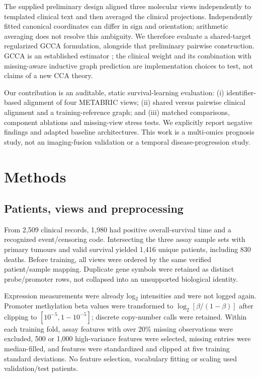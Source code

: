 \documentclass{article}
\begin{document}
The supplied preliminary design aligned three molecular views independently
to templated clinical text and then averaged the clinical projections.
Independently fitted canonical coordinates can differ in sign and orientation;
arithmetic averaging does not resolve this ambiguity. We therefore evaluate
a shared-target regularized GCCA formulation, alongside that preliminary
pairwise construction. GCCA is an established estimator \cite{gcca}; the
clinical weight and its combination with missing-aware inductive graph
prediction are implementation choices to test, not claims of a new CCA theory.

Our contribution is an auditable, static survival-learning evaluation:
(i) identifier-based alignment of four METABRIC views; (ii) shared versus
pairwise clinical alignment and a training-reference graph; and (iii) matched
comparisons, component ablations and missing-view stress tests. We explicitly
report negative findings and adapted baseline architectures. This work is a
multi-omics prognosis study, not an imaging-fusion validation or a temporal
disease-progression study.
\clearpage
\section{Methods}
\subsection{Patients, views and preprocessing}
From 2,509 clinical records, 1,980 had positive overall-survival time and a
recognized event/censoring code. Intersecting the three assay sample sets with
primary tumours and valid survival yielded 1,416 unique patients, including
830 deaths. Before training, all views were ordered by the same verified
patient/sample mapping. Duplicate gene symbols were retained as distinct
probe/promoter rows, not collapsed into an unsupported biological identity.

Expression measurements were already log$_2$ intensities and were not logged
again. Promoter methylation beta values were transformed to
$\log_2[\beta/(1-\beta)]$ after clipping to $[10^{-5},1-10^{-5}]$; discrete
copy-number calls were retained. Within each training fold, assay features
with over 20\% missing observations were excluded, 500 or 1,000 high-variance
features were selected, missing entries were median-filled, and features were
standardized and clipped at five training standard deviations. No feature
selection, vocabulary fitting or scaling used validation/test patients.
\end{document}
